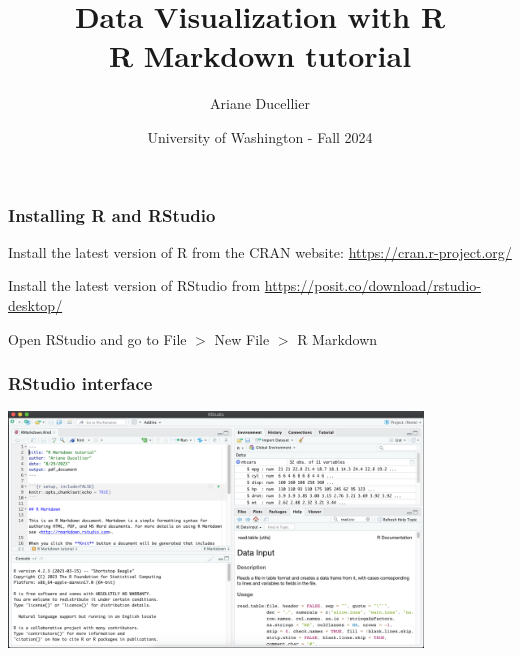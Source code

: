 \documentclass{beamer}
\title[Data Visualization with R - R Markdown tutorial]{Data Visualization with R \\ R Markdown tutorial}
\author{Ariane Ducellier}
\date{University of Washington - Fall 2024}
\begin{document}
	\begin{frame}
		\titlepage
	\end{frame}

	\begin{frame}
		\frametitle{Installing R and RStudio}

		Install the latest version of R from the CRAN website: \href{https://cran.r-project.org/}{https://cran.r-project.org/}

		\vspace{2em}

		Install the latest version of RStudio from \href{https://posit.co/download/rstudio-desktop/}{https://posit.co/download/rstudio-desktop/}

		\vspace{2em}

		Open RStudio and go to File $>$ New File $>$ R Markdown
		
	\end{frame}

	\begin{frame}
		\frametitle{RStudio interface}

		\centering
		\includegraphics[trim={0cm 0cm 0cm 0cm}, clip, width=11cm]{RMarkdown.png}
		
	\end{frame}
\end{document}

